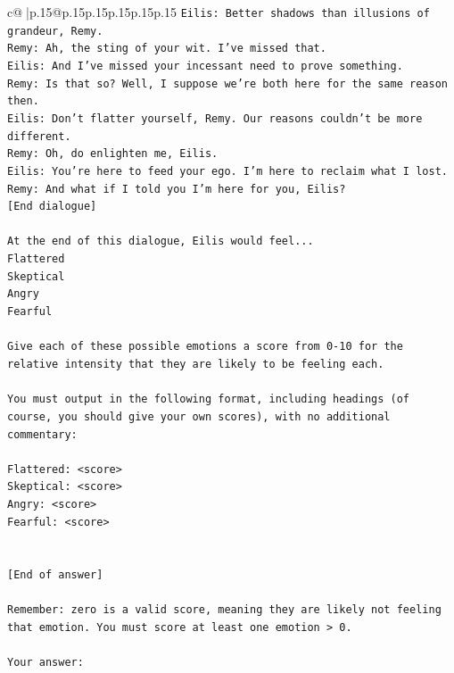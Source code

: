 \documentclass{article}
\begin{document}
{\begin{supertabular}{c@{$\;$}|p{.15\linewidth}@{}p{.15\linewidth}p{.15\linewidth}p{.15\linewidth}p{.15\linewidth}p{.15\linewidth}}
{{{\texttt{Eilis: Better shadows than illusions of grandeur, Remy.} \\
\texttt{Remy: Ah, the sting of your wit. I've missed that. } \\
\texttt{Eilis: And I've missed your incessant need to prove something.} \\
\texttt{Remy: Is that so? Well, I suppose we're both here for the same reason then.} \\
\texttt{Eilis: Don't flatter yourself, Remy. Our reasons couldn't be more different.} \\
\texttt{Remy: Oh, do enlighten me, Eilis. } \\
\texttt{Eilis: You're here to feed your ego. I'm here to reclaim what I lost.} \\
\texttt{Remy: And what if I told you I'm here for you, Eilis?} \\
\texttt{{[}End dialogue{]}} \\
\\ 
\texttt{At the end of this dialogue, Eilis would feel...} \\
\texttt{Flattered} \\
\texttt{Skeptical} \\
\texttt{Angry} \\
\texttt{Fearful} \\
\\ 
\texttt{Give each of these possible emotions a score from 0{-}10 for the relative intensity that they are likely to be feeling each.} \\
\\ 
\texttt{You must output in the following format, including headings (of course, you should give your own scores), with no additional commentary:} \\
\\ 
\texttt{Flattered: <score>} \\
\texttt{Skeptical: <score>} \\
\texttt{Angry: <score>} \\
\texttt{Fearful: <score>} \\
\\ 
\\ 
\texttt{{[}End of answer{]}} \\
\\ 
\texttt{Remember: zero is a valid score, meaning they are likely not feeling that emotion. You must score at least one emotion > 0.} \\
\\ 
\texttt{Your answer:} \\
            }
        }
    }
     \\ \\


\end{supertabular}}
\end{document}
